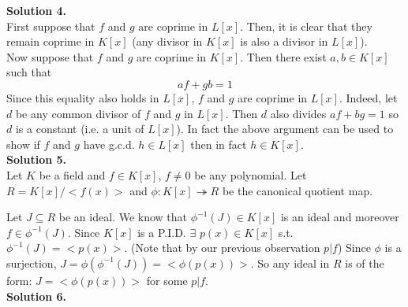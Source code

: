 \documentclass[12pt,a4paper]{article}
\begin{document}
\textbf{Solution 4.}\\

First suppose that $f$ and $g$ are coprime in $L[x]$. Then, it is clear that they remain coprime in $K[x]$ (any divisor in $K[x]$ is also a divisor in $L[x]$). \\ Now suppose that $f$ and $g$ are coprime in $K[x]$. Then there exist $a, b \in K[x]$ such that \[af + gb = 1\] Since this equality also holds in $L[x]$, $f$ and $g$ are coprime in $L[x]$. Indeed, let $d$ be any common divisor of $f$ and $g$ in $L[x]$. Then $d$ also divides $af + bg = 1$ so $d$ is a constant (i.e. a unit of $L[x]$). In fact the above argument can be used to show if $f$ and $g$ have g.c.d. $h\in L[x]$ then in fact $h\in K[x]$.\\



\textbf{Solution 5. }\\

Let $K$ be a field and $f\in K[x]$, $f\neq 0$ be any polynomial. Let $R=K[x]/<f(x)>$ and $\phi:K[x]\twoheadrightarrow R$ be the canonical quotient map.

Let $J\subseteq R$ be an ideal. We know that $\phi^{-1}(J)\in K[x]$ is an ideal and moreover $f\in \phi^{-1}(J)$. Since $K[x]$ is a P.I.D. $\exists$ $p(x)\in K[x]$ s.t. $\phi^{-1}(J)=<p(x)>$. (Note that by our previous observation $p|f$) Since $\phi$ is a surjection, $J=\phi(\phi^{-1}(J))=<\phi(p(x))>$. So any ideal in $R$ is of the form: $J=<\phi(p(x))>$ for some $p|f$. \\

\textbf{Solution 6. }
\end{document}
